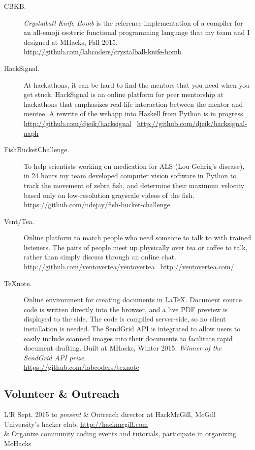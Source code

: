 \documentclass{article}
\newcommand\VRule{\color{lightgray}\vrule width 0.5pt}
\begin{document}
\begin{description}
    \item[CBKB.] \emph{Crystalball Knife Bomb} is the reference implementation
        of a compiler for an all-emoji esoteric functional programming language
        that my team and I designed at MHacks, Fall 2015. \\
        \url{http://github.com/labcoders/crystalball-knife-bomb}
    \item[HackSignal.] At hackathons, it can be hard to find the mentors that
        you need when you get stuck. HackSignal is an online platform for peer
        mentorship at hackathons that emphasizes real-life interaction between
        the mentor and mentee. A rewrite of the webapp into Haskell from Python
        is in progress. \\
        \url{http://github.com/djeik/hacksignal}~
        \url{http://github.com/djeik/hacksignal-naph}
    \item[FishBucketChallenge.] To help scientists working on medication for
        ALS (Lou Gehrig's disease), in 24 hours my team developed computer
        vision software in Python to track the movement of zebra fish, and
        determine their maximum velocity based only on low-resolution grayscale
        videos of the fish. \\
        \url{https://github.com/ndejay/fish-bucket-challenge}
    \item[Vent/Tea.] Online platform to match people who need someone to talk
        to with trained listeners. The pairs of people meet up physically over
        tea or coffee to talk, rather than simply discuss through an online
        chat. \\
        \url{http://github.com/ventovertea/ventovertea}~
        \url{http://ventovertea.com/}
    \item[TeXnote.] Online environment for creating documents in \LaTeX.
        Document source code is written directly into the browser, and a live
        PDF preview is displayed to the side. The code is compiled server-side,
        so no client installation is needed. The SendGrid API is integrated to
        allow users to easily include scanned images into their documents to
        facilitate rapid document drafting. Built at MHacks, Winter 2015.
        \emph{Winner of the SendGrid API prize.} \\
        \url{https://github.com/labcoders/texnote}
\end{description}

\subsection*{Volunteer \& Outreach}

\begin{tabular}[h]{L!{\VRule}R}
    Sept. 2015 to \emph{present}
        & Outreach director at HackMcGill, McGill University's hacker club, \url{http://hackmcgill.com} \\
        & Organize community coding events and tutorials, participate in organizing McHacks
\end{tabular}
\end{document}
